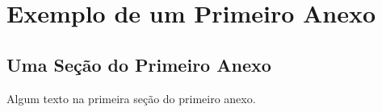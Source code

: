 \chapter{Exemplo de um Primeiro Anexo}


\section{Uma Seção do Primeiro Anexo}
Algum texto na primeira seção do primeiro anexo.

